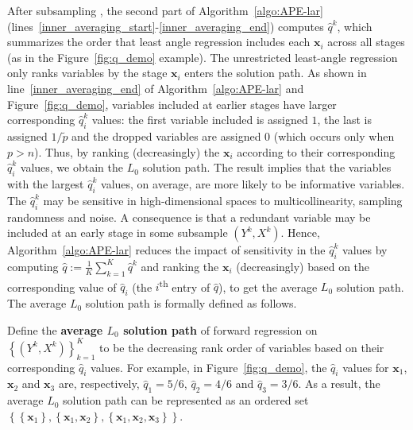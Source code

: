 \documentclass[12pt]{article}
\begin{document}
After subsampling , the second part of Algorithm~\ref{algo:APE-lar} (lines~\ref{inner_averaging_start}-\ref{inner_averaging_end}) computes $\widehat{q}^k$, which summarizes the order that least angle regression includes each $\mathbf{x}_i$ across all stages (as in the Figure~\ref{fig:q_demo} example). The unrestricted least-angle regression only ranks variables by the stage $\mathbf{x}_i$ enters the solution path. As shown in line~\ref{inner_averaging_end} of Algorithm~\ref{algo:APE-lar} and Figure~\ref{fig:q_demo}, variables included at earlier stages have larger corresponding $\widehat{q}^k_i$ values: the first variable included is assigned $1$, the last is assigned $1/\widetilde{p}$ and the dropped variables are assigned $0$ (which occurs only when $p > n$). Thus, by ranking (decreasingly) the $\mathbf{x}_i$ according to their corresponding $\widehat{q}^k_i$ values, we obtain the $L_0$ solution path. The \citet[Theorem 2]{zhang09} result implies that the variables with the largest $\widehat{q}^k_i$ values, on average, are more likely to be informative variables. The $\widehat{q}^k_i$ may be sensitive in high-dimensional spaces to multicollinearity, sampling randomness and noise. A consequence is that a redundant variable may be included at an early stage in some subsample $\left( Y^k, X^k \right)$. Hence, Algorithm~\ref{algo:APE-lar} reduces the impact of sensitivity in the $\widehat{q}^k_i$ values by computing $\widehat{q} := \frac{1}{K} \sum_{k=1}^{K} \widehat{q}^k$ and ranking the $\mathbf{x}_i$ (decreasingly) based on the corresponding value of $\widehat{q}_i$ (the $i$\textsuperscript{th} entry of $\widehat{q}$), to get the average $L_0$ solution path. The average $L_0$ solution path is formally defined as follows.
%
\begin{definition}
  Define the \textbf{average $L_0$ solution path} of forward regression on $\left\{ \left( Y^k, X^k \right) \right\}_{k=1}^{K}$ to be the decreasing rank order of variables based on their corresponding $\widehat{q}_i$ values. For example, in Figure~\ref{fig:q_demo}, the $\widehat{q}_i$ values for $\mathbf{x}_1$, $\mathbf{x}_2$ and $\mathbf{x}_3$ are, respectively, $\widehat{q}_1 = 5/6$, $\widehat{q}_2 = 4/6$ and $\widehat{q}_3 = 3/6$. As a result, the average $L_0$ solution path can be represented as an ordered set $\left\{ \left\{ \mathbf{x}_1 \right\}, \left\{ \mathbf{x}_1, \mathbf{x}_2 \right\}, \left\{ \mathbf{x}_1, \mathbf{x}_2, \mathbf{x}_3 \right\} \right\}$.
  \label{def:L_0_solution_path}
\end{definition}
\end{document}
